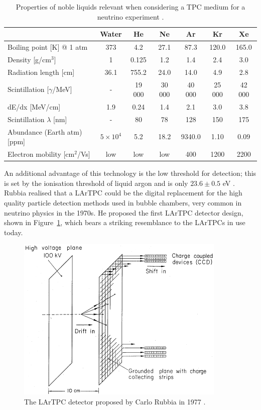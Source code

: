 \begin{table}
  \caption{Properties of noble liquids relevant when considering a TPC medium for a neutrino experiment \cite{Soderberg2008}.}
  \label{tab:NobleProperties}
  \centering
  \begin{tabular}{ l c c c c c c }
    \toprule
     & Water & He & Ne & \color{red} Ar & Kr & Xe \\
    \midrule
    Boiling point [K] @ 1 atm & 373 & 4.2 & 27.1 & \color{red} 87.3 & 120.0 & 165.0 \\
    Density [g/cm$^3$] & 1 & 0.125 & 1.2 & \color{red} 1.4 & 2.4 & 3.0 \\
    Radiation length [cm] & 36.1 & 755.2 & 24.0 & \color{red} 14.0 & 4.9 & 2.8 \\
    Scintillation [$\gamma$/MeV] & - & 19 000 & 30 000 & \color{red} 40 000 & 25 000 & 42 000 \\
    dE/dx [MeV/cm] & 1.9 & 0.24 & 1.4 & \color{red} 2.1 & 3.0 & 3.8 \\
    Scintillation $\lambda$ [nm] & - & 80 & 78 & \color{red} 128 & 150 & 175 \\
    Abundance (Earth atm) [ppm] & $5\times 10^4$ & 5.2 & 18.2 & \color{red} 9340.0 & 1.10 & 0.09 \\
    Electron mobility [cm$^2$/Vs] & low & low & low & \color{red} 400 & 1200 & 2200 \\
    \bottomrule
  \end{tabular}
\end{table}

An additional advantage of this technology is the low threshold for detection; this is set by the ionisation threshold of liquid argon and is only $23.6 \pm 0.5$ eV \cite{Chepel2013}.  Rubbia realised that a LArTPC could be the digital replacement for the high quality particle detection methods used in bubble chambers, very common in neutrino physics in the 1970s.  He proposed the first LArTPC detector design, shown in Figure~\ref{fig:RubbiaLArTPC}, which bears a striking resemblance to the LArTPCs in use today.

\begin{figure}
  \centering
  \includegraphics[width=10cm]{RubbiaLArTPC.png}
  \caption[First LArTPC detector, Rubbia (1977)]{The LArTPC detector proposed by Carlo Rubbia in 1977 \cite{Rubbia1977}.}
  \label{fig:RubbiaLArTPC}
\end{figure}

